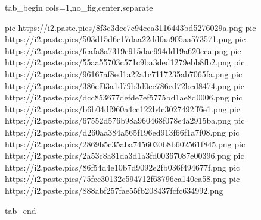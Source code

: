  
 
 
 
 

\ifcmt
  tab_begin cols=1,no_fig,center,separate

     pic https://i2.paste.pics/8f3c3dcc7c94cca3116443bd5276029a.png
		 pic https://i2.paste.pics/503d15d6c17daa22ddfaa905aa573571.png
		 pic https://i2.paste.pics/feafa8a7319c915dac994dd19a620cca.png
		 pic https://i2.paste.pics/55aa55703c571c9ba3ded1279ebb8fb2.png
		 pic https://i2.paste.pics/96167af8ed1a22a1c7117235ab7065fa.png
		 pic https://i2.paste.pics/386ef03a1d79b3d0ec786ed72bcd8474.png
		 pic https://i2.paste.pics/dcc853677defde7ef5775bd1ae8d0006.png
		 pic https://i2.paste.pics/b6b04df960a4cc122b4c3027492ff6e1.png
		 pic https://i2.paste.pics/67552d576b98a960468f078e4a2915ba.png
		 pic https://i2.paste.pics/d260aa384a565f196ed913f66f1a7f08.png
		 pic https://i2.paste.pics/2869b5c35aba7456030b8b602561f845.png
		 pic https://i2.paste.pics/2a53c8a81da3d1a3fd00367087e00396.png
		 pic https://i2.paste.pics/86f54d4e10b7d9092e2fb036f494677f.png
		 pic https://i2.paste.pics/75fcc30132c594712f68796ca140ea58.png
		 pic https://i2.paste.pics/888abf257fae55fb208437fcfc634992.png

  tab_end
\fi
